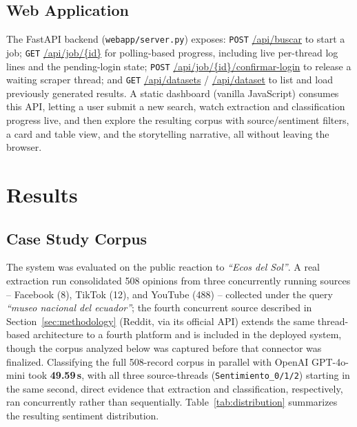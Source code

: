 \documentclass[runningheads]{llncs}
\begin{document}
\subsection{Web Application}

The FastAPI backend (\texttt{webapp/server.py}) exposes: \texttt{POST}
\url{/api/buscar} to start a job; \texttt{GET} \url{/api/job/{id}} for
polling-based progress, including live per-thread log lines and the
pending-login state; \texttt{POST} \url{/api/job/{id}/confirmar-login} to
release a waiting scraper thread; and \texttt{GET} \url{/api/datasets} /
\url{/api/dataset} to list and load previously generated results. A static
dashboard (vanilla
JavaScript) consumes this API, letting a user submit a new search, watch
extraction and classification progress live, and then explore the resulting
corpus with source/sentiment filters, a card and table view, and the
storytelling narrative, all without leaving the browser.

\section{Results}
\label{sec:results}

\subsection{Case Study Corpus}

The system was evaluated on the public reaction to \emph{``Ecos del
Sol''}. A real extraction run consolidated 508 opinions from three
concurrently running sources -- Facebook (8), TikTok (12), and YouTube (488)
-- collected under the query \emph{``museo nacional del ecuador''}; the
fourth concurrent source described in Section~\ref{sec:methodology}
(Reddit, via its official API) extends the same thread-based architecture to
a fourth platform and is included in the deployed system, though the corpus
analyzed below was captured before that connector was finalized.
Classifying the full 508-record corpus in parallel with OpenAI GPT-4o-mini
took \textbf{49.59\,s}, with all three source-threads (\texttt{Sentimiento\_0/1/2})
starting in the same second, direct evidence that extraction and
classification, respectively, ran concurrently rather than sequentially.
Table~\ref{tab:distribution} summarizes the resulting sentiment distribution.
\end{document}
